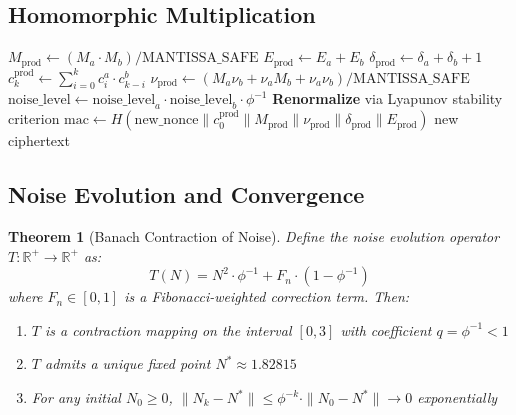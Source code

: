 \documentclass[11pt,a4paper]{article}
\newtheorem{theorem}{Theorem}[section]
\DeclareMathOperator{\Mult}{Mult}
\begin{document}
\subsection{Homomorphic Multiplication}

\begin{algorithm}[H]
\caption{$\Mult(ct_a, ct_b)$}
\label{alg:mult}
\begin{algorithmic}[1]
\State $M_{\text{prod}} \gets (M_a \cdot M_b) / \text{MANTISSA\_SAFE}$ 
\State $E_{\text{prod}} \gets E_a + E_b$
\State $\delta_{\text{prod}} \gets \delta_a + \delta_b + 1$
 
    \State $c_k^{\text{prod}} \gets \sum_{i=0}^{k} c_i^a \cdot c_{k-i}^b$
\EndFor
\State $\nu_{\text{prod}} \gets (M_a\nu_b + \nu_a M_b + \nu_a\nu_b) / \text{MANTISSA\_SAFE}$
\State $\text{noise\_level} \gets \text{noise\_level}_a \cdot \text{noise\_level}_b \cdot \phi^{-1}$ 
\State \textbf{Renormalize} via Lyapunov stability criterion
\State $\text{mac} \gets H(\text{new\_nonce} \| c_0^{\text{prod}} \| M_{\text{prod}} \| \nu_{\text{prod}} \| \delta_{\text{prod}} \| E_{\text{prod}})$
\State \Return new ciphertext
\end{algorithmic}
\end{algorithm}

\subsection{Noise Evolution and Convergence}

\begin{theorem}[Banach Contraction of Noise]
\label{thm:banach}
Define the noise evolution operator $T: \mathbb{R}^+ \to \mathbb{R}^+$ as:
\begin{equation}
\label{eq:noise_evolution}
T(N) = N^2 \cdot \phi^{-1} + F_n \cdot (1 - \phi^{-1})
\end{equation}
where $F_n \in [0,1]$ is a Fibonacci-weighted correction term. Then:
\begin{enumerate}[leftmargin=*,itemsep=2pt]
    \item $T$ is a contraction mapping on the interval $[0, 3]$ with coefficient $q = \phi^{-1} < 1$
    \item $T$ admits a unique fixed point $N^* \approx 1.82815$
    \item For any initial $N_0 \geq 0$, $\|N_k - N^*\| \leq \phi^{-k} \cdot \|N_0 - N^*\| \to 0$ exponentially
\end{enumerate}
\end{theorem}
\end{document}
